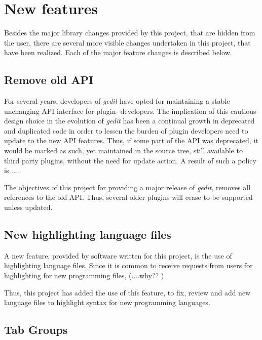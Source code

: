 
\section{New features}\label{sec:NewFeatures}

Besides the major library changes provided by this project, that are hidden from the 
user, there are several more visible changes undertaken in this project, that have been 
realized.  Each of the major feature changes is described below.


\subsection{Remove old API}\label{sec:RemoveOldAPI}

For several years, developers of \emph{gedit} have opted for maintaining a stable unchanging 
API interface for plugin- developers. The implication of this cautious design choice in the 
evolution of \emph{gedit} has been a continual growth in deprecated and duplicated code 
in order to lessen the burden of plugin developers need to update to the new API features. 
Thus, if some part of the API was deprecated, it would be marked as such, yet maintained 
in the source tree, still available to third party plugins, without the need for update action.
A result of such a policy is .....

The objectives of this project for providing a major release of \emph{gedit}, removes 
all references to the old API.  Thus, several older plugins will cease to be supported 
unless updated.


\subsection{New highlighting language files}\label{sec:HighFiles}

A new feature, provided by software written for this project, is the use of 
highlighting language files.   Since it is common to receive requests from 
users for highlighting for new programming files, (....why?? )

Thus, this project has added the use of this feature, to fix, review and 
add new language files to highlight syntax for new programming languages.


\subsection{Tab Groups}\label{sec:TabGroups}

